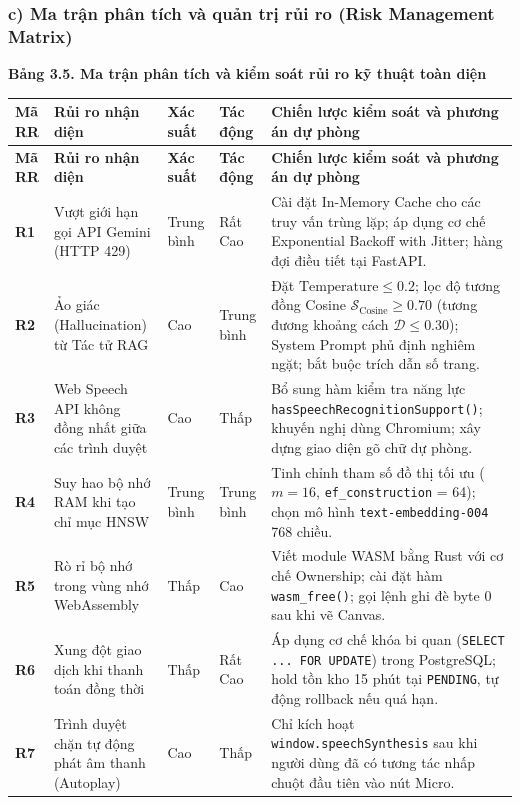 \documentclass[11pt, a4paper]{report}
\begin{document}
\subsubsection{c) Ma trận phân tích và quản trị rủi ro (Risk Management Matrix)}

\vspace{0.3cm}
\noindent\textbf{Bảng 3.5. Ma trận phân tích và kiểm soát rủi ro kỹ thuật toàn diện}

\begin{longtable}{p{1.0cm} p{3.5cm} p{1.4cm} p{1.4cm} p{6.8cm}}
\toprule
\textbf{Mã RR} & \textbf{Rủi ro nhận diện} & \textbf{Xác suất} & \textbf{Tác động} & \textbf{Chiến lược kiểm soát và phương án dự phòng} \\
\midrule
\endfirsthead
\toprule
\textbf{Mã RR} & \textbf{Rủi ro nhận diện} & \textbf{Xác suất} & \textbf{Tác động} & \textbf{Chiến lược kiểm soát và phương án dự phòng} \\
\midrule
\endhead
\bottomrule
\endfoot
\textbf{R1} & Vượt giới hạn gọi API Gemini (HTTP 429) & Trung bình & Rất Cao & Cài đặt In-Memory Cache cho các truy vấn trùng lặp; áp dụng cơ chế Exponential Backoff with Jitter; hàng đợi điều tiết tại FastAPI. \\
\midrule
\textbf{R2} & Ảo giác (Hallucination) từ Tác tử RAG & Cao & Trung bình & Đặt $\text{Temperature} \le 0.2$; lọc độ tương đồng Cosine $\mathcal{S}_{\text{Cosine}} \ge 0.70$ (tương đương khoảng cách $\mathcal{D} \le 0.30$); System Prompt phủ định nghiêm ngặt; bắt buộc trích dẫn số trang. \\
\midrule
\textbf{R3} & Web Speech API không đồng nhất giữa các trình duyệt & Cao & Thấp & Bổ sung hàm kiểm tra năng lực \texttt{hasSpeechRecognitionSupport()}; khuyến nghị dùng Chromium; xây dựng giao diện gõ chữ dự phòng. \\
\midrule
\textbf{R4} & Suy hao bộ nhớ RAM khi tạo chỉ mục HNSW & Trung bình & Trung bình & Tinh chỉnh tham số đồ thị tối ưu ($m = 16$, \texttt{ef\_construction} = 64); chọn mô hình \texttt{text-embedding-004} 768 chiều. \\
\midrule
\textbf{R5} & Rò rỉ bộ nhớ trong vùng nhớ WebAssembly & Thấp & Cao & Viết module WASM bằng Rust với cơ chế Ownership; cài đặt hàm \texttt{wasm\_free()}; gọi lệnh ghi đè byte 0 sau khi vẽ Canvas. \\
\midrule
\textbf{R6} & Xung đột giao dịch khi thanh toán đồng thời & Thấp & Rất Cao & Áp dụng cơ chế khóa bi quan (\texttt{SELECT ... FOR UPDATE}) trong PostgreSQL; hold tồn kho 15 phút tại \texttt{PENDING}, tự động rollback nếu quá hạn. \\
\midrule
\textbf{R7} & Trình duyệt chặn tự động phát âm thanh (Autoplay) & Cao & Thấp & Chỉ kích hoạt \texttt{window.speechSynthesis} sau khi người dùng đã có tương tác nhấp chuột đầu tiên vào nút Micro. \\
\bottomrule
\end{longtable}
\end{document}

